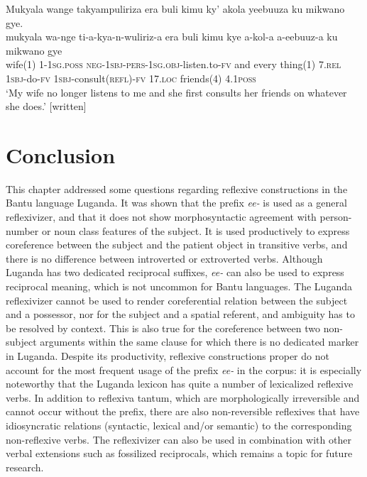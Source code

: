 \documentclass[output=paper,colorlinks,citecolor=brown,
]{langscibook}
\begin{document}
\ex \label{ex:Witzlack:30b}
    \glll Mukyala wange takyampuliriza era buli kimu ky’ akola yeebuuza ku mikwano gye.\\
    mukyala wa-nge 	ti-a-kya-n-wuliriz-a era buli kimu kye a-kol-a a-eebuuz-a 	ku 	mikwano	gye\\
    wife(1)	1-\textsc{1sg.poss} \textsc{neg-1sbj-pers-1sg.obj}-listen.to-\textsc{fv} and every	thing(1) \textsc{7.rel}	\textsc{1sbj}-do-\textsc{fv} \textsc{1sbj}-consult(\textsc{refl})-\textsc{fv} \textsc{17.loc} friends(4)	\textsc{4.1poss}\\
    \glt ‘My wife no longer listens to me and she first consults her friends on whatever she does.’ [written] %

\z
\z


\section{Conclusion}\label{sec:Witzlack:8}

This chapter addressed some questions regarding reflexive constructions in the Bantu language Luganda. It was shown that the prefix \emph{ee-} is used as a general reflexivizer, and that it does not show morphosyntactic agreement with person-number or noun class features of the subject. 
It is used productively to express coreference between the subject and the patient object in transitive verbs, and there is no difference between introverted or extroverted verbs.
Although Luganda has two dedicated reciprocal suffixes, \emph{ee-} can also be used to express reciprocal meaning, which is not uncommon for Bantu languages. 
The Luganda reflexivizer cannot be used to render coreferential relation between the subject and a possessor, nor for the subject and a spatial referent, and ambiguity has to be resolved by context. This is also true for the coreference between two non-subject arguments within the same clause for which there is no dedicated marker in Luganda. Despite its productivity, reflexive constructions proper do not account for the most frequent usage of the prefix \emph{ee-} in the corpus: it is especially noteworthy that the Luganda lexicon has quite a number of lexicalized reflexive verbs. In addition to reflexiva tantum, which are morphologically irreversible and cannot occur without the prefix, there are also non-reversible reflexives that have idiosyncratic relations (syntactic, lexical and/or semantic) to the corresponding non-reflexive verbs. The reflexivizer can also be used in combination with other verbal extensions such as fossilized reciprocals, which remains a topic for future research.
\end{document}
